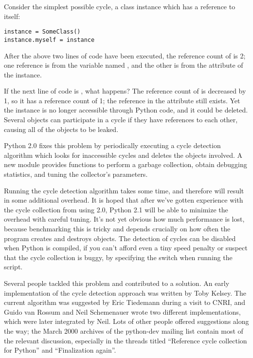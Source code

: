 \documentclass{howto}
\begin{document}
Consider the simplest possible cycle, 
a class instance which has a reference to itself:

\begin{verbatim}
instance = SomeClass()
instance.myself = instance
\end{verbatim}

After the above two lines of code have been executed, the reference
count of  is 2; one reference is from the variable
named , and the other is from the 
attribute of the instance.  

If the next line of code is , what happens?  The
reference count of  is decreased by 1, so it has a
reference count of 1; the reference in the  attribute
still exists.  Yet the instance is no longer accessible through Python
code, and it could be deleted.  Several objects can participate in a
cycle if they have references to each other, causing all of the
objects to be leaked.

Python 2.0 fixes this problem by periodically executing a cycle
detection algorithm which looks for inaccessible cycles and deletes
the objects involved.  A new  module provides functions to
perform a garbage collection, obtain debugging statistics, and tuning
the collector's parameters.

Running the cycle detection algorithm takes some time, and therefore
will result in some additional overhead.  It is hoped that after we've
gotten experience with the cycle collection from using 2.0, Python 2.1
will be able to minimize the overhead with careful tuning.  It's not
yet obvious how much performance is lost, because benchmarking this is
tricky and depends crucially on how often the program creates and
destroys objects.  The detection of cycles can be disabled when Python
is compiled, if you can't afford even a tiny speed penalty or suspect
that the cycle collection is buggy, by specifying the
 switch when running the 
script.

Several people tackled this problem and contributed to a solution.  An
early implementation of the cycle detection approach was written by
Toby Kelsey.  The current algorithm was suggested by Eric Tiedemann
during a visit to CNRI, and Guido van Rossum and Neil Schemenauer
wrote two different implementations, which were later integrated by
Neil.  Lots of other people offered suggestions along the way; the
March 2000 archives of the python-dev mailing list contain most of the
relevant discussion, especially in the threads titled ``Reference
cycle collection for Python'' and ``Finalization again''.
\end{document}

